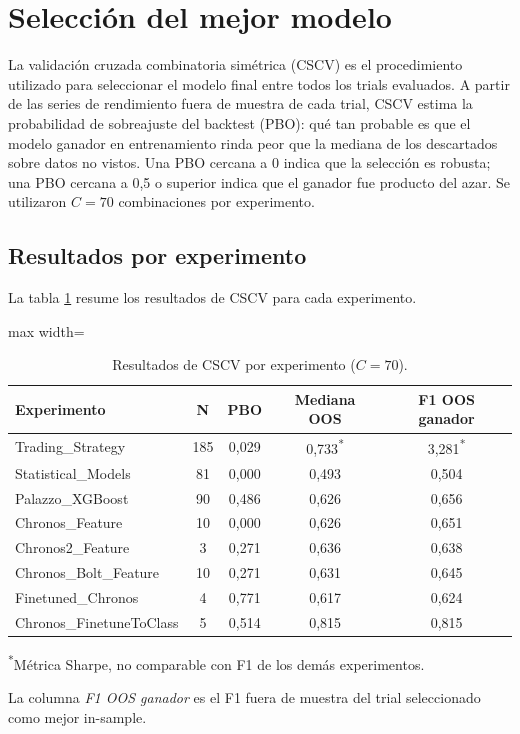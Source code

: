 \section{Selección del mejor modelo}

La validación cruzada combinatoria simétrica (CSCV) es el procedimiento utilizado para seleccionar el modelo final entre todos los trials evaluados. A partir de las series de rendimiento fuera de muestra de cada trial, CSCV estima la probabilidad de sobreajuste del backtest (PBO): qué tan probable es que el modelo ganador en entrenamiento rinda peor que la mediana de los descartados sobre datos no vistos. Una PBO cercana a 0 indica que la selección es robusta; una PBO cercana a 0,5 o superior indica que el ganador fue producto del azar. Se utilizaron $C=70$ combinaciones por experimento.

\subsection{Resultados por experimento}

La tabla \ref{tab:cscv_results} resume los resultados de CSCV para cada experimento. 

\begin{table}[H]
    \centering
    \caption[Resultados CSCV por experimento]{Resultados de CSCV por experimento ($C=70$).}
    \small
    \begin{adjustbox}{max width=\textwidth}
    \begin{tabular}{l c c c c}
        \toprule
        \textbf{Experimento} & \textbf{N} & \textbf{PBO} & \textbf{Mediana OOS} & \textbf{F1 OOS ganador} \\
        \midrule
        Trading\_Strategy        & 185 & 0,029 & 0,733\textsuperscript{*} & 3,281\textsuperscript{*} \\
        Statistical\_Models      &  81 & 0,000 & 0,493          & 0,504 \\
        Palazzo\_XGBoost         &  90 & 0,486          & 0,626          & 0,656 \\
        Chronos\_Feature         &  10 & 0,000 & 0,626          & 0,651 \\
        Chronos2\_Feature        &   3 & 0,271          & 0,636          & 0,638 \\
        Chronos\_Bolt\_Feature   &  10 & 0,271          & 0,631          & 0,645 \\
        Finetuned\_Chronos       &   4 & 0,771          & 0,617          & 0,624 \\
        Chronos\_FinetuneToClass &   5 & 0,514          & 0,815          & 0,815 \\
        \bottomrule
    \end{tabular}
    \end{adjustbox}
    \footnotesize\textsuperscript{*}Métrica Sharpe, no comparable con F1 de los demás experimentos.
    \label{tab:cscv_results}
\end{table}
La columna \textit{F1 OOS ganador} es el F1 fuera de muestra del trial seleccionado como mejor in-sample.

